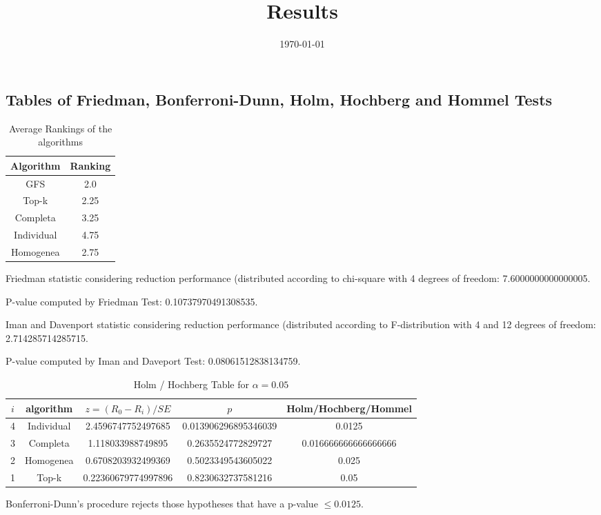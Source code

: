 \documentclass[a4paper,10pt]{article}
\title{Results}
\author{}
\date{\today}
\begin{document}
\begin{landscape}
\oddsidemargin 0in \topmargin 0in\maketitle
\section{Tables of Friedman, Bonferroni-Dunn, Holm, Hochberg and Hommel Tests}
\begin{table}[!htp]
\centering
\caption{Average Rankings of the algorithms
}\begin{tabular}{c|c}
Algorithm&Ranking\\
\hline
GFS&2.0\\
Top-k&2.25\\
Completa&3.25\\
Individual&4.75\\
Homogenea&2.75\\
\end{tabular}
\end{table}


Friedman statistic considering reduction performance (distributed according to chi-square with 4 degrees of freedom: 7.6000000000000005.


P-value computed by Friedman Test: 0.10737970491308535.\newline

Iman and Davenport statistic considering reduction performance (distributed according to F-distribution with 4 and 12 degrees of freedom: 2.714285714285715.


P-value computed by Iman and Daveport Test: 0.08061512838134759.\newline

\begin{table}[!htp]
\centering\tiny
\caption{Holm / Hochberg Table for $\alpha=0.05$}
\begin{tabular}{ccccc}
$i$&algorithm&$z=(R_0 - R_i)/SE$&$p$&Holm/Hochberg/Hommel\\
\hline
4&Individual&2.4596747752497685&0.013906296895346039&0.0125\\
3&Completa&1.118033988749895&0.2635524772829727&0.016666666666666666\\
2&Homogenea&0.6708203932499369&0.5023349543605022&0.025\\
1&Top-k&0.22360679774997896&0.8230632737581216&0.05\\
\hline
\end{tabular}
\end{table}
Bonferroni-Dunn's procedure rejects those hypotheses that have a p-value $\le0.0125$.



\end{landscape}
\end{document}
